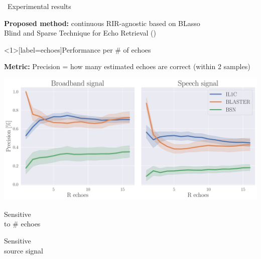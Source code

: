 \begin{frame}[t]{\faFlask~Experimental results \hfill\faJediOrder}
    \vspace{2mm}
    \begin{mycontriblock}
        \textbf{Proposed method:} continuous RIR-agnostic based on BLasso
        \\Blind and Sparse Technique for Echo Retrieval (\blaster)
    \end{mycontriblock}

\end{frame}


\begin{frame}<1>[label=echoes]{Performance per \# of echoes \hfill\faJediOrder}

    \textbf{Metric:} \alert{Precision} = how many estimated echoes are correct (within 2 samples)

    \begin{center}
        \includegraphics[width=0.8\linewidth]{figures/p_k-7_thr-2_bns_crocco_blaster-peak_withRechoes.pdf}
        \\
    \end{center}

    \begin{center}
        \textcolor{myred}{\xmark \: \parbox{8em}{Sensitive\\to \# echoes}}
        \textcolor{myred}{\xmark \: \parbox{8em}{Sensitive\\source signal}}
    \end{center}

\end{frame}



